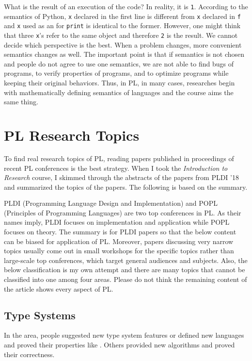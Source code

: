 What is the result of an execution of the code? In reality, it is \verb+1+.
According to the semantics of Python,  \verb+x+ declared in the first
line is different from \verb+x+ declared in  \verb+f+ and \verb+x+ used as an
 for \verb+print+ is identical to the former. However, one might think
that three \verb+x+'s refer to the same object and therefore \verb+2+ is the result. We
cannot decide which perspective is the best. When a problem changes, more
convenient semantics changes as well. The important point is that if semantics
is not chosen and people do not agree to use one semantics, we are not able to
find bugs of programs, to verify properties of programs, and to optimize
programs while keeping their original behaviors. Thus, in PL, in many cases,
researches begin with mathematically defining semantics of languages and the
course aims the same thing.

\section{PL Research Topics}

To find real research topics of PL, reading papers published in proceedings of recent PL conferences is
the best strategy. When I took the \textit{Introduction to Research} course, I
skimmed through the abstracts of the papers from PLDI '18 and summarized the
topics of the papers. The following is based on the summary.

PLDI (Programming Language Design and Implementation) and POPL (Principles of
Programming Languages) are two top conferences in PL. As their names imply,
PLDI focuses on implementation and application while POPL focuses on theory.
The summary is for PLDI papers so that the below content can be biased for
application of PL. Moreover, papers discussing very narrow topics usually come
out in small workshops for the specific topics rather than large-scale top
conferences, which target general audiences and subjects. Also, the below
classification is my own attempt and there are many topics that cannot be
classified into one among four areas. Please do not think the remaining
content of the article shows every aspect of PL.

\subsection{Type Systems}

In the  area, people suggested new type system features or defined new languages and
proved their properties like . Others provided new  algorithms and proved their correctness.

